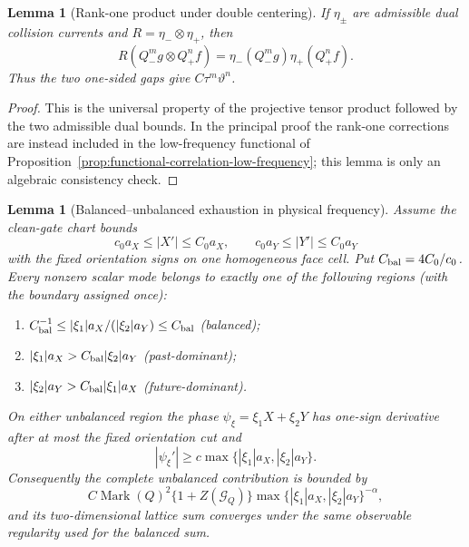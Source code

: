 \documentclass[11pt]{article}
\newtheorem{lemma}[theorem]{Lemma}
\begin{document}
\begin{lemma}[Rank-one product under double centering]
\label{lem:rank-one-product}
If \(\eta_\pm\) are admissible dual collision currents and
\(R=\eta_-\otimes\eta_+\), then
\[
 R(Q_-^mg\otimes Q_+^nf)
 =\eta_-(Q_-^mg)\eta_+(Q_+^nf).
\]
Thus the two one-sided gaps give \(C\tau^m\vartheta^n\).
\end{lemma}

\begin{proof}
This is the universal property of the projective tensor product followed by
the two admissible dual bounds.  In the principal proof the rank-one
corrections are instead included in the low-frequency functional of
Proposition~\ref{prop:functional-correlation-low-frequency}; this lemma is
only an algebraic consistency check.
\end{proof}

\begin{lemma}[Balanced--unbalanced exhaustion in physical frequency]
\label{lem:balanced-unbalanced-exhaustion}
Assume the clean-gate chart bounds
\begin{equation}
\label{eq:primitive-dominant-chart-bounds}
 c_0a_X\le |X'|\le C_0a_X,\qquad
 c_0a_Y\le |Y'|\le C_0a_Y
\end{equation}
with the fixed orientation signs on one homogeneous face cell.  Put
$C_{\rm bal}=4C_0/c_0$.  Every nonzero scalar mode belongs to exactly one of
the following regions (with the boundary assigned once):
\begin{enumerate}[label=\textup{(\roman*)}]
\item $C_{\rm bal}^{-1}\le
 |\xi_1|a_X/(|\xi_2|a_Y)\le C_{\rm bal}$ (balanced);
\item $|\xi_1|a_X>C_{\rm bal}|\xi_2|a_Y$ (past-dominant);
\item $|\xi_2|a_Y>C_{\rm bal}|\xi_1|a_X$ (future-dominant).
\end{enumerate}
On either unbalanced region the phase
$\psi_\xi=\xi_1X+\xi_2Y$ has one-sign derivative after at most the fixed
orientation cut and
\begin{equation}
\label{eq:unbalanced-derivative-lower-bound}
 |\psi_\xi'|\ge c\max\{|\xi_1|a_X,|\xi_2|a_Y\}.
\end{equation}
Consequently the complete unbalanced contribution is bounded by
\begin{equation}
\label{eq:unbalanced-mode-saving}
 C\operatorname{Mark}(Q)^2\{1+Z(\mathcal G_Q)\}
 \max\{|\xi_1|a_X,|\xi_2|a_Y\}^{-\alpha},
\end{equation}
and its two-dimensional lattice sum converges under the same observable
regularity used for the balanced sum.
\end{lemma}
\end{document}
